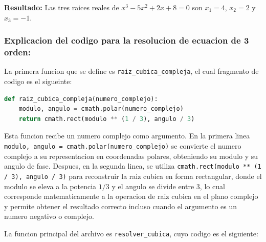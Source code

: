 \documentclass[letterpaper,12pt]{article}
\begin{document}
    \textbf{Resultado:} Las tres raices reales de $x^3 - 5x^2 + 2x + 8 = 0$ son $x_1 = 4$, $x_2 = 2$ y $x_3 = -1$.

    \subsubsection{Explicacion del codigo para la resolucion de ecuacion de 3 orden: }
    La primera funcion que se define es \texttt{raiz\_cubica\_compleja}, el cual fragmento de codigo es el sigueinte:

    \begin{lstlisting}[language=Python, basicstyle=\ttfamily\scriptsize, caption={Función para calcular la raíz cúbica de un número complejo}, label={lst:raiz_cubica}]
def raiz_cubica_compleja(numero_complejo):
    modulo, angulo = cmath.polar(numero_complejo)
    return cmath.rect(modulo ** (1 / 3), angulo / 3)
    \end{lstlisting}

    Esta funcion recibe un numero complejo como argumento. En la primera linea \texttt{modulo, angulo = cmath.polar(numero\_complejo)} se convierte el numero complejo a su representacion en coordenadas polares, obteniendo su modulo y su angulo de fase. Despues, en la segunda linea, se utiliza \texttt{cmath.rect(modulo ** (1 / 3), angulo / 3)} para reconstruir la raiz cubica en forma rectangular, donde el modulo se eleva a la potencia $1/3$ y el angulo se divide entre 3, lo cual corresponde matematicamente a la operacion de raiz cubica en el plano complejo y permite obtener el resultado correcto incluso cuando el argumento es un numero negativo o complejo.

    \newpage
    La funcion principal del archivo es \texttt{resolver\_cubica}, cuyo codigo es el siguiente:
\end{document}
